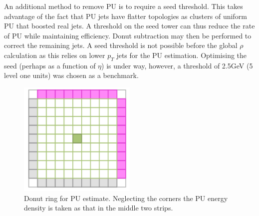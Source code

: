 An additional method to remove PU is to require a seed threshold. This takes advantage of the fact that PU jets have flatter topologies as clusters of uniform PU that boosted real jets. A threshold on the seed tower can thus reduce the rate of PU while maintaining efficiency. Donut subtraction may then be performed to correct the remaining jets. A seed threshold is not possible before the global $\rho$ calculation as this relies on lower $p_{T}$ jets for the PU estimation. Optimising the seed (perhaps as a function of $\eta$) is under way, however, a threshold of 2.5GeV (5 level one units) was chosen as a benchmark.
\begin{figure}
\centering
    \includegraphics[width=0.5\textwidth]{Figures/donut}
  \caption{Donut ring for PU estimate. Neglecting the corners the PU energy density is taken as that in the middle two strips.}
  \label{mask}
\end{figure}  
